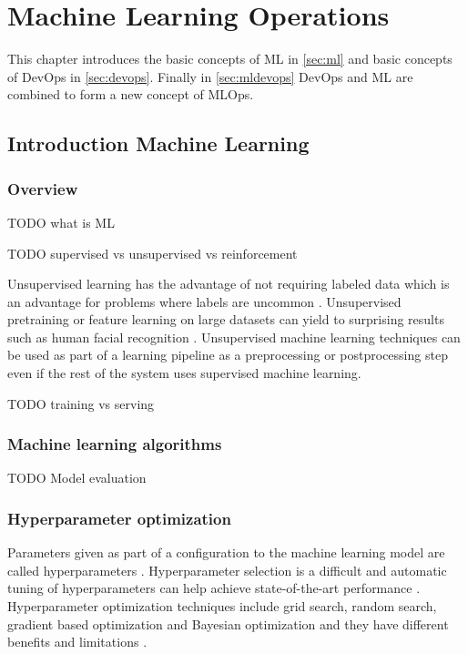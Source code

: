 \chapter{Machine Learning Operations}

This chapter introduces the basic concepts of ML in \autoref{sec:ml} and basic concepts of DevOps in \autoref{sec:devops}. Finally in \autoref{sec:mldevops} DevOps and ML are combined to form a new concept of MLOps.

\section{Introduction Machine Learning}
\label{sec:ml}

\subsection{Overview}
TODO what is ML

TODO supervised vs unsupervised vs reinforcement

Unsupervised learning has the advantage of not requiring labeled data which is an advantage for problems where labels are uncommon \parencite{leBuildingHighlevelFeatures2012}. Unsupervised pretraining or feature learning on large datasets can yield to surprising results such as human facial recognition \parencite{leBuildingHighlevelFeatures2012}. Unsupervised machine learning techniques can be used as part of a learning pipeline as a preprocessing or postprocessing step even if the rest of the system uses supervised machine learning.

TODO training vs serving

\subsection{Machine learning algorithms}

TODO Model evaluation


\subsection{Hyperparameter optimization}

Parameters given as part of a configuration to the machine learning model are called hyperparameters \parencite{yangHyperparameterOptimizationMachine2020}. Hyperparameter selection is a difficult and automatic tuning of hyperparameters can help achieve state-of-the-art performance \parencite{maclaurinGradientbasedHyperparameterOptimization2015}. Hyperparameter optimization techniques include grid search, random search, gradient based optimization and Bayesian optimization and they have different benefits and limitations \parencite{yangHyperparameterOptimizationMachine2020}. 

